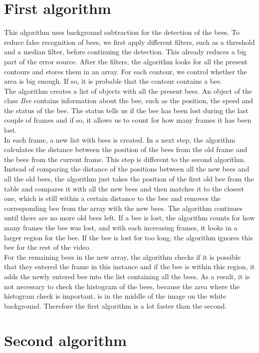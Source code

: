 \documentclass[10pt,twocolumn,letterpaper]{article}
\begin{document}
\section{First algorithm}
This algorithm uses background subtraction for the detection of the bees.
To reduce false recognition of bees, we first apply different filters, such as a threshold and a median filter, before continuing the detection. This already reduces a big part of the error source. After the filters, the algorithm looks for all the present contours and stores them in an array. For each contour, we control whether the area is big enough. If so, it is probable that the contour contains a bee.\\
The algorithm creates a list of objects with all the present bees. An object of the class \textit{Bee} contains information about the bee, such as the position, the speed and the status of the bee. The status tells us if the bee has been lost during the last couple of frames and if so, it allows us to count for how many frames it has been lost.\\
In each frame, a new list with bees is created. In a next step, the algorithm calculates the distance between the position of the bees from the old frame and the bees from the current frame. This step is different to the second algorithm. Instead of comparing the distance of the positions between all the new bees and all the old bees, the algorithm just takes the position of the first old bee from the table and compares it with all the new bees and then matches it to the closest one, which is still within a certain distance to the bee and removes the corresponding bee from the array with the new bees. The algorithm continues until there are no more old bees left. If a bee is lost, the algorithm counts for how many frames the bee was lost, and with each increasing frames, it looks in a larger region for the bee. If the bee is lost for too long, the algorithm ignores this bee for the rest of the video.\\
For the remaining bees in the new array, the algorithm checks if it is possible that they entered the frame in this instance and if the bee is within this region, it adds the newly entered bee into the list containing all the bees. As a result, it is not necessary to check the histogram of the bees, because the area where the histogram check is important, is in the middle of the image on the white background. Therefore the first algorithm is a lot faster than the second.


\section{Second algorithm}
\end{document}
